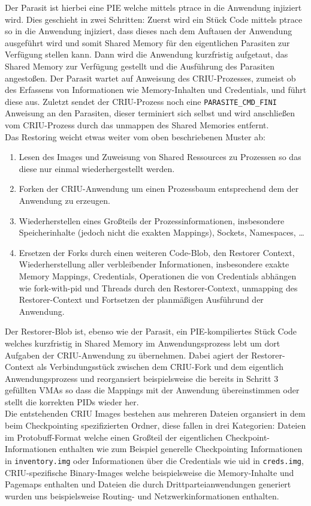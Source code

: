 \documentclass[a4paper]{article}
\begin{document}
Der Parasit ist hierbei eine PIE welche mittels ptrace in die Anwendung injiziert wird. Dies geschieht in zwei Schritten: Zuerst wird ein Stück Code mittels ptrace so in die Anwendung injiziert, dass dieses nach dem Auftauen der Anwendung ausgeführt wird und somit Shared Memory für den eigentlichen Parasiten zur Verfügung stellen kann. Dann wird die Anwendung kurzfristig aufgetaut, das Shared Memory zur Verfügung gestellt und die Ausführung des Parasiten angestoßen. Der Parasit wartet auf Anweisung des CRIU-Prozesses, zumeist ob des Erfassens von Informationen wie Memory-Inhalten und Credentials, und führt diese aus. Zuletzt sendet der CRIU-Prozess noch eine \texttt{PARASITE\_CMD\_FINI} Anweisung an den Parasiten, dieser terminiert sich selbst und wird anschließen vom CRIU-Prozess durch das unmappen des Shared Memories entfernt.\\
Das Restoring weicht etwas weiter vom oben beschriebenen Muster ab:
\begin{enumerate}
    \item Lesen des Images und Zuweisung von Shared Ressources zu Prozessen so das diese nur einmal wiederhergestellt werden.
    \item Forken der CRIU-Anwendung um einen Prozessbaum entsprechend dem der Anwendung zu erzeugen.
    \item Wiederherstellen eines Großteils der Prozessinformationen, insbesondere Speicherinhalte (jedoch nicht die exakten Mappings), Sockets, Namespaces, \dots
    \item Ersetzen der Forks durch einen weiteren Code-Blob, den Restorer Context, Wiederherstellung aller verbleibender Informationen, insbesondere exakte Memory Mappings, Credentials, Operationen die von Credentials abhängen wie fork-with-pid und Threads durch den Restorer-Context, unmapping des Restorer-Context und Fortsetzen der planmäßigen Ausführund der Anwendung.
\end{enumerate}
Der Restorer-Blob ist, ebenso wie der Parasit, ein PIE-kompiliertes Stück Code welches kurzfristig in Shared Memory im Anwendungsprozess lebt um dort Aufgaben der CRIU-Anwendung zu übernehmen. Dabei agiert der Restorer-Context als Verbindungsstück zwischen dem CRIU-Fork und dem eigentlich Anwendungsprozess und reorgansiert beispielsweise die bereits in Schritt 3 gefüllten VMAs so dass die Mappings mit der Anwendung übereinstimmen oder stellt die korrekten PIDs wieder her.\\
Die entstehenden CRIU Images bestehen aus mehreren Dateien organsiert in dem beim Checkpointing spezifizierten Ordner, diese fallen in drei Kategorien: Dateien im Protobuff-Format welche einen Großteil der eigentlichen Checkpoint-Informationen enthalten wie zum Beispiel generelle Checkpointing Informationen in \texttt{inventory.img} oder Informationen über die Credentials wie uid in \texttt{creds.img}, CRIU-spezifische Binary-Images welche beispielsweise die Memory-Inhalte und Pagemaps enthalten und Dateien die durch Drittparteianwendungen generiert wurden uns beispielsweise Routing- und Netzwerkinformationen enthalten.
\end{document}
